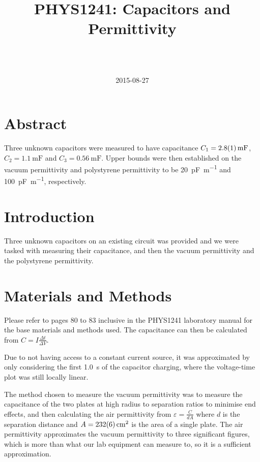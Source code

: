 \documentclass[a4paper]{scrartcl}
\begin{document}
\title{PHYS1241: Capacitors and Permittivity}
\author{ \\ \\ }
\date{2015-08-27}
\maketitle

\section{Abstract}
Three unknown capacitors were measured to have capacitance \(C_1 = \SI{2.8 \pm 0.1}{\milli\farad}\), \(C_2 = \SI{1.1}{\milli\farad}\) and \(C_3 = \SI{0.56}{\milli\farad}\). Upper bounds were then established on the vacuum permittivity and polystyrene permittivity to be \SI{20}{\pico\farad\per\metre} and \SI{100}{\pico\farad\per\metre}, respectively.

\section{Introduction}
Three unknown capacitors on an existing circuit was provided and we were tasked with measuring their capacitance, and then the vacuum permittivity and the polystyrene permittivity.

\section{Materials and Methods}
Please refer to pages 80 to 83 inclusive in the PHYS1241 laboratory manual for the base materials and methods used. The capacitance can then be calculated from \(C = I \frac{\Delta t}{\Delta V}\).

Due to not having access to a constant current source, it was approximated by only considering the first \SI{1.0}{\second} of the capacitor charging, where the voltage-time plot was still locally linear.

The method chosen to measure the vacuum permittivity was to measure the capacitance of the two plates at high radius to separation ratios to minimise end effects, and then calculating the air permittivity from \(\varepsilon = \frac{C}{d A}\) where \(d\) is the separation distance and \(A = \SI{232 \pm 6}{\centi\meter\squared}\) is the area of a single plate. The air permittivity approximates the vacuum permittivity to three significant figures, which is more than what our lab equipment can measure to, so it is a sufficient approximation.
\end{document}
